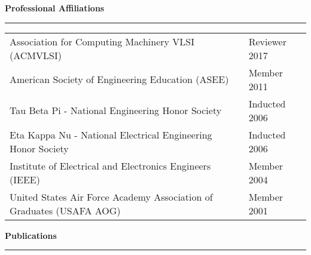 \large
\textbf{Professional Affiliations}\\
\rule{\textwidth}{1pt}

\begin{table}[h!]
\centering
\small
\begin{tabular}{ p{12.5cm} p{4.5cm}}
	Association for Computing Machinery VLSI (ACMVLSI) & Reviewer 2017 \\
	American Society of Engineering Education (ASEE) & Member 2011 \\
	Tau Beta Pi - National Engineering Honor Society & Inducted 2006\\
	Eta Kappa Nu - National Electrical Engineering Honor Society & Inducted 2006\\
	Institute of Electrical and Electronics Engineers (IEEE) & Member 2004 \\
	United States Air Force Academy Association of Graduates (USAFA AOG) & Member 2001
\end{tabular}
\end{table}

\newpage

\large
\textbf{Publications}\\
\rule{\textwidth}{1pt}

